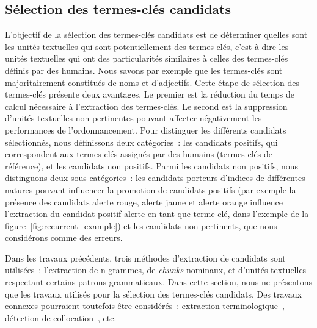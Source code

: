   \subsection{Sélection des termes-clés candidats}
  \label{subsec:extraction_de_termes_cles_candidats}
    L'objectif de la sélection des termes-clés candidats est de déterminer
    quelles sont les unités textuelles qui sont potentiellement des termes-clés,
    c'est-à-dire les unités textuelles qui ont des particularités similaires à
    celles des termes-clés définis par des humains. Nous
    savons par exemple que les termes-clés sont majoritairement constitués de
    noms et d'adjectifs. Cette étape de sélection des termes-clés présente deux
    avantages. Le premier est la réduction du temps de calcul nécessaire à
    l'extraction des  termes-clés. Le second est la suppression d'unités
    textuelles non pertinentes pouvant affecter négativement les
    performances de l'ordonnancement. Pour distinguer les différents candidats
    sélectionnés, nous définissons deux catégories~: les candidats positifs, qui
    correspondent aux termes-clés assignés par des humains (termes-clés de
    référence), et les candidats non positifs. Parmi les candidats non positifs,
    nous distinguons deux sous-catégories~: les candidats porteurs d'indices de
    différentes natures pouvant influencer la promotion de candidats positifs
    (par exemple la présence des candidats \og{}alerte rouge\fg{}, \og{}alerte
    jaune\fg{} et \og{}alerte orange\fg{} influence l'extraction du candidat
    positif \og{}alerte\fg{} en tant que terme-clé, dans l'exemple de la
    figure~\ref{fig:recurrent_example}) et
    les candidats non pertinents, que nous considérons comme des erreurs.

    Dans les travaux précédents, trois méthodes d'extraction de candidats sont
    utilisées~: l'extraction de n-grammes, de \textit{chunks} nominaux, et d'unités
    textuelles respectant certains patrons grammaticaux. Dans cette section,
    nous ne présentons que les travaux utilisés pour la sélection des
    termes-clés candidats. Des travaux connexes pourraient toutefois être
    considérés~: extraction
    terminologique~\cite{castellvi2001automatictermdetection}, détection de
    collocation~\cite{pearce2002collocationdetection}, etc.

